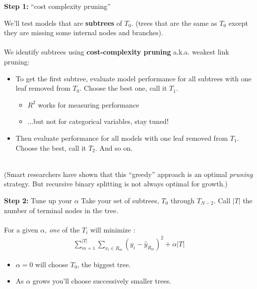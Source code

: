 \documentclass[mathserif, aspectratio=169]{beamer}
\begin{document}
\begin{frame}{\textbf{Step 1: } ``cost complexity pruning''}

We'll test models that are \textbf{subtrees} of $T_0$. (trees that are the same as $T_0$ except they are missing some internal nodes and branches).\\~\\

We identify subtrees using \textbf{cost-complexity pruning} a.k.a. weakest link pruning:
\vspace{4mm}
\begin{itemize}
\item To get the first subtree, evaluate model performance for all subtrees with one leaf removed from $T_0$.  Choose the best one, call it $T_1$.  
\begin{itemize}
\item $R^2$ works for measuring performance
\item ...but not for categorical variables, stay tuned!
\end{itemize}
\vspace{4mm}
\item Then evaluate performance for all models with one leaf removed from $T_1$.  Choose the best, call it $T_2$.  And so on.  \\~\\
\end{itemize}

\pause

(Smart researchers have shown that this ``greedy'' approach is an optimal \textit{pruning} strategy.  But recursive binary splitting is not always optimal for growth.)

\end{frame}

\begin{frame}{\textbf{Step 2: } Tune up your $\alpha$}
Take your set of subtrees, $T_0$ through $T_{N-2}$.  Call $|T|$ the number of terminal nodes in the tree.\\~\\

For a given $\alpha$, \textit{one} of the $T_i$ will minimize :
\begin{align*}
\sum_{m=1}^{|T|} \sum_{x_i\in R_m} (y_i-\hat{y}_{R_m})^2+\alpha|T|
\end{align*}

\begin{itemize}
\item $\alpha=0$ will choose $T_0$, the biggest tree.
\item As $\alpha$ grows you'll choose successively smaller trees.  \\~\\
\end{itemize}

\end{frame}
\end{document}
